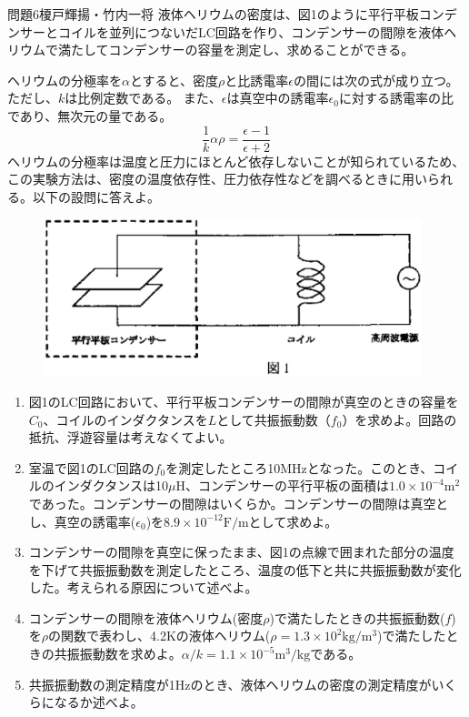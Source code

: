 \documentclass[fleqn]{jbook}
\begin{document}
\begin{question}{問題6}{榎戸輝揚・竹内一将}
液体ヘリウムの密度は、図1のように平行平板コンデンサーとコイルを並列につないだLC回路を作り、コンデンサーの間隙を液体ヘリウムで満たしてコンデンサーの容量を測定し、求めることができる。\par
ヘリウムの分極率を$\alpha$とすると、密度$\rho$と比誘電率$\epsilon$の間には次の式が成り立つ。ただし、$k$は比例定数である。
また、$\epsilon$は真空中の誘電率$\epsilon_0$に対する誘電率の比であり、無次元の量である。
\[
\frac{1}{k}\alpha \rho=\frac{\epsilon -1}{\epsilon +2 }
\]
ヘリウムの分極率は温度と圧力にほとんど依存しないことが知られているため、この実験方法は、密度の温度依存性、圧力依存性などを調べるときに用いられる。以下の設問に答えよ。

\begin{figure}[htbp]
  \begin{center}
    \includegraphics[width=110mm]{2003phy6-1.eps}
  \end{center}
\end{figure}

\begin{enumerate}
\item 図1のLC回路において、平行平板コンデンサーの間隙が真空のときの容量を$C_0$、コイルのインダクタンスを$L$として共振振動数（$f_0$）を求めよ。回路の抵抗、浮遊容量は考えなくてよい。
\item 室温で図1のLC回路の$f_0$を測定したところ10MHzとなった。このとき、コイルのインダクタンスは10$\mu$H、コンデンサーの平行平板の面積は$1.0\times 10^{-4}\mathrm{m}^2$であった。コンデンサーの間隙はいくらか。コンデンサーの間隙は真空とし、真空の誘電率($\epsilon_0$)を$8.9\times10^{-12}\mathrm{F/m}$として求めよ。
\item コンデンサーの間隙を真空に保ったまま、図1の点線で囲まれた部分の温度を下げて共振振動数を測定したところ、温度の低下と共に共振振動数が変化した。考えられる原因について述べよ。
\item コンデンサーの間隙を液体ヘリウム(密度$\rho$)で満たしたときの共振振動数($f$)を$\rho$の関数で表わし、4.2Kの液体ヘリウム($\rho=1.3\times10^2 \mathrm{kg/m^3}$)で満たしたときの共振振動数を求めよ。$\alpha/k=1.1\times 10^{-5}\mathrm{m^3/kg}$である。
\item 共振振動数の測定精度が1Hzのとき、液体ヘリウムの密度の測定精度がいくらになるか述べよ。


\end{enumerate}
\end{question}
\end{document}
